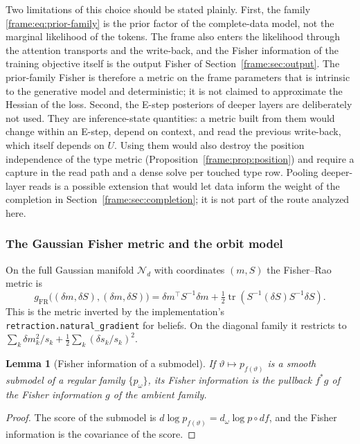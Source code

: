\documentclass[11pt]{article}
\newtheorem{lemma}[theorem]{Lemma}
\theoremstyle{definition}
\theoremstyle{remark}
\providecommand{\tr}{\operatorname{tr}}
\providecommand{\Normal}{\mathcal{N}}
\begin{document}
Two limitations of this choice should be stated plainly. First, the family \eqref{frame:eq:prior-family} is the prior factor of the complete-data model, not the marginal likelihood of the tokens. The frame also enters the likelihood through the attention transports and the write-back, and the Fisher information of the training objective itself is the output Fisher of Section~\ref{frame:sec:output}. The prior-family Fisher is therefore a metric on the frame parameters that is intrinsic to the generative model and deterministic; it is not claimed to approximate the Hessian of the loss. Second, the E-step posteriors of deeper layers are deliberately not used. They are inference-state quantities: a metric built from them would change within an E-step, depend on context, and read the previous write-back, which itself depends on $U$. Using them would also destroy the position independence of the type metric (Proposition~\ref{frame:prop:position}) and require a capture in the read path and a dense solve per touched type row. Pooling deeper-layer reads is a possible extension that would let data inform the weight of the completion in Section~\ref{frame:sec:completion}; it is not part of the route analyzed here.

\subsubsection{The Gaussian Fisher metric and the orbit model}

On the full Gaussian manifold $\Normal_d$ with coordinates $(m,S)$ the Fisher--Rao metric \cite{frame:Skovgaard1984} is
\begin{equation}\label{frame:eq:gaussian-fisher}
g_{\mathrm{FR}}\big((\delta m,\delta S),(\delta m,\delta S)\big)=\delta m^\top S^{-1}\delta m+\tfrac12\tr\left(S^{-1}(\delta S)S^{-1}\delta S\right).
\end{equation}
This is the metric inverted by the implementation's \texttt{retraction.natural\_gradient} for beliefs. On the diagonal family it restricts to $\sum_k\delta m_k^2/s_k+\frac12\sum_k(\delta s_k/s_k)^2$.

\begin{lemma}[Fisher information of a submodel]\label{frame:lem:submodel}
If $\vartheta\mapsto p_{f(\vartheta)}$ is a smooth submodel of a regular family $\{p_\omega\}$, its Fisher information is the pullback $f^*g$ of the Fisher information $g$ of the ambient family.
\end{lemma}
\begin{proof}
The score of the submodel is $d\log p_{f(\vartheta)}=d_\omega\log p\circ df$, and the Fisher information is the covariance of the score.
\end{proof}
\end{document}
